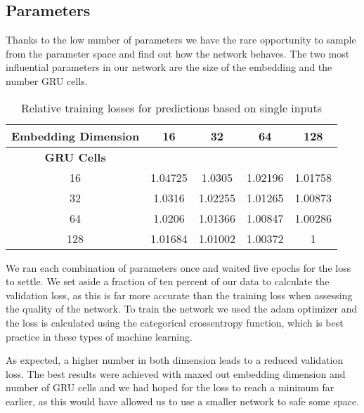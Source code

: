   \subsection{Parameters}
  \label{sub:parameters}

    Thanks to the low number of parameters we have the rare opportunity to sample from the parameter space and
    find out how the network behaves. The two most influential parameters in our network are the size of the 
    embedding and the number GRU cells.
  
  \begin{table}[htpb]
    \centering
    \label{tab:single}
    \begin{tabular}{| c | c | c | c | c |}
      \hline \textbf{Embedding Dimension}  & 16  & 32  & 64 & 128 \\ \hline
      \textbf{GRU Cells} &  & & & \\
      16 & \cellcolor[rgb]{0.9,0.6,0}1.04725 & \cellcolor[rgb]{0.8,0.65,0}  1.0305 & \cellcolor[rgb]{0.75,0.7,0}  1.02196 & \cellcolor[rgb]{0.7,0.75,0}  1.01758 \\ \hline
      32 & \cellcolor[rgb]{0.85,0.65,0} 1.0316 &\cellcolor[rgb]{0.8,0.7,0} 1.02255 &\cellcolor[rgb]{0.65,0.85,0}  1.01265 & \cellcolor[rgb]{0.6,0.9,0} 1.00873 \\ \hline
      64 &\cellcolor[rgb]{0.75,0.75,0}  1.0206 &\cellcolor[rgb]{0.65,0.8,0}  1.01366 & \cellcolor[rgb]{0.55,0.9,0} 1.00847 & \cellcolor[rgb]{0.5,0.95,0} 1.00286 \\ \hline
      128 &\cellcolor[rgb]{0.7,0.8,0}  1.01684 &\cellcolor[rgb]{0.6,0.85,0}  1.01002 & \cellcolor[rgb]{0.55,0.95,0} 1.00372 & \cellcolor[rgb]{0.5,1,0} 1 \\ \hline
    \end{tabular}
    \caption{Relative training losses for predictions based on single inputs}
  \end{table}

    We ran each combination of parameters once and waited five epochs for the loss to settle. We set aside
    a fraction of ten percent of our data to calculate the validation loss, as this is far more
    accurate than the training loss when assessing the quality of the network. To train the network
    we used the adam optimizer and the loss is calculated using the categorical crossentropy function, which
    is best practice in these types of machine learning.

    As expected, a higher number in both dimension leads to a reduced validation loss. The best results
    were achieved with maxed out embedding dimension and number of GRU cells and we had hoped for the loss to
    reach a minimum far earlier, as this would have allowed us to use a smaller network to safe some space.

